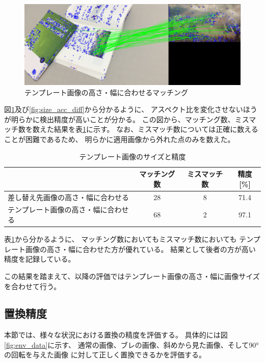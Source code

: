 \begin{figure}[h]
    \centering
    \includegraphics[width=1\linewidth]{fig/matches_SIFT_same.png}
    \caption{テンプレート画像の高さ・幅に合わせるマッチング}
    \label{fig:size_acc_same}
\end{figure}

図\ref{fig:size_acc_same}及び\ref{fig:size_acc_diff}から分かるように、
アスペクト比を変化させないほうが明らかに検出精度が高いことが分かる。
この図から、マッチング数、ミスマッチ数を数えた結果を表\ref{tb:size_acc}に示す。
なお、ミスマッチ数については正確に数えることが困難であるため、
明らかに適用画像から外れた点のみを数えた。

\begin{table}[h]
    \centering
    \caption{テンプレート画像のサイズと精度}
    \label{tb:size_acc}
    \begin{tabular}{lccc} \hline \hline
         & マッチング数 & ミスマッチ数 & 精度[\%]\\ \hline
        差し替え先画像の高さ・幅に合わせる & 28 & 8 & 71.4 \\
        テンプレート画像の高さ・幅に合わせる & 68 & 2 & 97.1 \\ \hline
    \end{tabular}
\end{table}

表\ref{tb:size_acc}から分かるように、
マッチング数においてもミスマッチ数においても
テンプレート画像の高さ・幅に合わせた方が優れている。
結果として後者の方が高い精度を記録している。

この結果を踏まえて、以降の評価ではテンプレート画像の高さ・幅に画像サイズを合わせて行う。

\subsection{置換精度}
本節では、様々な状況における置換の精度を評価する。
具体的には図\ref{fig:env_data}に示す、
通常の画像、ブレの画像、斜めから見た画像、そして90°の回転を与えた画像
に対して正しく置換できるかを評価する。

